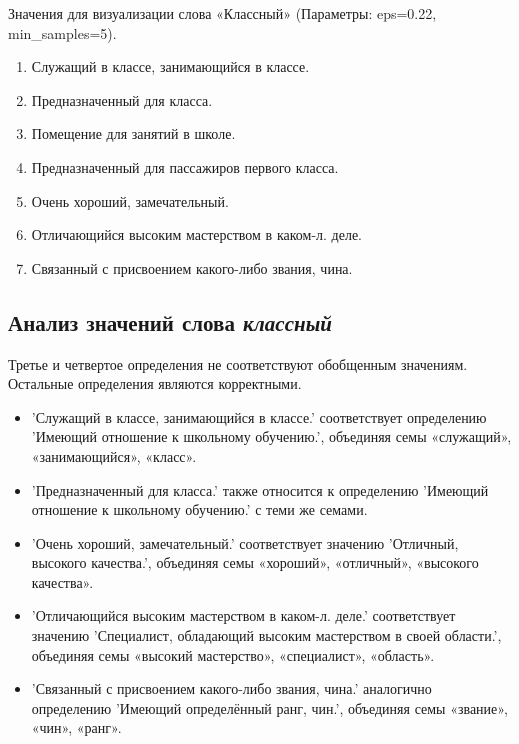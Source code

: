 Значения для визуализации слова «Классный» (Параметры: eps=0.22, min\_samples=5).

\begin{enumerate}
    \item Служащий в классе, занимающийся в классе.
    \item Предназначенный для класса.
    \item Помещение для занятий в школе.
    \item Предназначенный для пассажиров первого класса.
    \item Очень хороший, замечательный.
    \item Отличающийся высоким мастерством в каком-л. деле.
    \item Связанный с присвоением какого-либо звания, чина.
\end{enumerate}

\subsection*{Анализ значений слова \textit{классный}}

Третье и четвертое определения не соответствуют обобщенным значениям.
Остальные определения являются корректными.

\begin{itemize}
    \item ’Служащий в классе, занимающийся в классе.’ соответствует определению
’Имеющий отношение к школьному обучению.’, объединяя семы «служащий», «занимающийся», «класс».

    \item ’Предназначенный для класса.’ также относится к определению
’Имеющий отношение к школьному обучению.’ с теми же семами.

    \item ’Очень хороший, замечательный.’ соответствует значению ’Отличный, высокого качества.’,
объединяя семы «хороший», «отличный», «высокого качества».

    \item ’Отличающийся высоким мастерством в каком-л. деле.’ соответствует значению
’Специалист, обладающий высоким мастерством в своей области.’,
объединяя семы «высокий мастерство», «специалист», «область».

    \item ’Связанный с присвоением какого-либо звания, чина.’ аналогично определению
’Имеющий определённый ранг, чин.’, объединяя семы «звание», «чин», «ранг».
\end{itemize}

